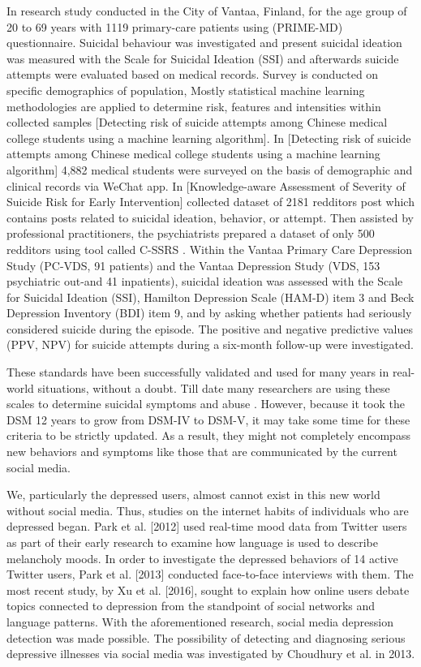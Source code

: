 \documentclass[12pt, letterpaper]{article}
\begin{document}
In \cite{vuorilehto2006suicidal} research study conducted in the City of Vantaa, Finland, for the age group of 20 to 69 years with 1119 primary-care patients using (PRIME-MD) questionnaire. Suicidal behaviour was investigated and present suicidal ideation was measured with the Scale for Suicidal Ideation (SSI) and afterwards suicide attempts were evaluated based on medical records. Survey is conducted on specific demographics of population, Mostly statistical machine learning methodologies are applied to determine risk, features and intensities within collected samples [Detecting risk of suicide attempts among Chinese medical college students using a machine learning algorithm]. In [Detecting risk of suicide attempts among Chinese medical college students using a machine learning algorithm] 4,882 medical students were surveyed on the basis of demographic and clinical records via WeChat app. In [Knowledge-aware Assessment of Severity of Suicide Risk for Early Intervention] collected dataset of 2181 redditors post which contains posts related to suicidal ideation, behavior, or attempt. Then assisted by professional practitioners, the psychiatrists prepared a dataset of only 500 redditors using tool called C-SSRS \cite{posner2011columbia}. \cite{vuorilehto2014method} Within the Vantaa Primary Care Depression Study (PC-VDS, 91 patients) and the Vantaa Depression Study (VDS, 153 psychiatric out-and 41 inpatients), suicidal ideation was assessed with the Scale for Suicidal Ideation (SSI), Hamilton Depression Scale (HAM-D) item 3 and Beck Depression Inventory (BDI) item 9, and by asking whether patients had seriously considered suicide during the episode. The positive and negative predictive values (PPV, NPV) for suicide attempts during a six-month follow-up were investigated. 


These standards have been successfully validated and used for many years in real-world situations, without a doubt. Till date many researchers are using these scales to determine suicidal symptoms and abuse \cite{li2022association}. However, because it took the DSM 12 years to grow from DSM-IV to DSM-V, it may take some time for these criteria to be strictly updated. As a result, they might not completely encompass new behaviors and symptoms like those that are communicated by the current social media.


\cite{shen2017depression} We, particularly the depressed users, almost cannot exist in this new world without social media. Thus, studies on the internet habits of individuals who are depressed began. Park et al. [2012] used real-time mood data from Twitter users as part of their early research to examine how language is used to describe melancholy moods. In order to investigate the depressed behaviors of 14 active Twitter users, Park et al. [2013] conducted face-to-face interviews with them. The most recent study, by Xu et al. [2016], sought to explain how online users debate topics connected to depression from the standpoint of social networks and language patterns. With the aforementioned research, social media depression detection was made possible. The possibility of detecting and diagnosing serious depressive illnesses via social media was investigated by Choudhury et al. in 2013.
\end{document}

